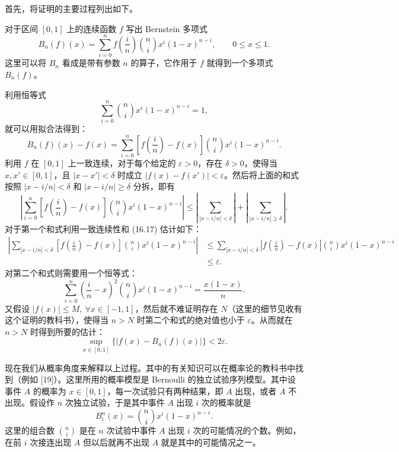 首先，将证明的主要过程列出如下。

对于区间 $[0,1]$ 上的连续函数 $f$ 写出 Bernstein 多项式
\begin{equation}
  B_n(f)(x)=\sum_{i=0}^n f\left(\frac in\right)\binom ni x^i(1-x)^{n-i},
  \qquad 0\leqslant x\leqslant1.
\tag{16.16}
\label{eq:16.16}
\end{equation}
这里可以将 $B_n$ 看成是带有参数 $n$ 的算子，它作用于 $f$ 就得到一个多项式 $B_n(f)$。

利用恒等式
\begin{equation}
  \sum_{i=0}^n\binom ni x^i(1-x)^{n-i}=1,
\tag{16.17}
\label{eq:16.17}
\end{equation}
就可以用拟合法得到：
\[
  B_n(f)(x)-f(x)
  =\sum_{i=0}^n\left[f\left(\frac in\right)-f(x)\right]
   \binom ni x^i(1-x)^{n-i}.
\]
利用 $f$ 在 $[0,1]$ 上一致连续，对于每个给定的 $\varepsilon>0$，存在 $\delta>0$，使得当 $x,x'\in[0,1]$，且 $|x-x'|<\delta$ 时成立 $|f(x)-f(x')|<\varepsilon$。然后将上面的和式按照 $|x-i/n|<\delta$ 和 $|x-i/n|\geqslant\delta$ 分拆，即有
\[
\left|\sum_{i=0}^n\left[f\left(\frac in\right)-f(x)\right]\binom ni x^i(1-x)^{n-i}\right|
\leqslant\left|\sum_{|x-i/n|<\delta}\right|+
\left|\sum_{|x-i/n|\geqslant\delta}\right|.
\]
对于第一个和式利用一致连续性和 (16.17) 估计如下：
\[
\begin{aligned}
  \left|\sum_{|x-i/n|<\delta}\left[f\left(\frac in\right)-f(x)\right]
  \binom ni x^i(1-x)^{n-i}\right|
  &\leqslant\sum_{|x-i/n|<\delta}
  \left|f\left(\frac in\right)-f(x)\right|\binom ni x^i(1-x)^{n-i}\\
  &\leqslant\varepsilon.
\end{aligned}
\]
对第二个和式则需要用一个恒等式：
\begin{equation}
  \sum_{i=0}^n\left(\frac in-x\right)^2\binom ni x^i(1-x)^{n-i}
  =\frac{x(1-x)}n.
\tag{16.18}
\label{eq:16.18}
\end{equation}
又假设 $|f(x)|\leqslant M,\ \forall x\in[-1,1]$，然后就不难证明存在 $N$（这里的细节见收有这个证明的教科书），使得当 $n>N$ 时第二个和式的绝对值也小于 $\varepsilon$。从而就在 $n>N$ 时得到所要的估计：
\[
  \sup_{x\in[0,1]}\{|f(x)-B_n(f)(x)|\}<2\varepsilon.
\]

现在我们从概率角度来解释以上过程。其中的有关知识可以在概率论的教科书中找到（例如 [19]）。这里所用的概率模型是 Bernoulli 的独立试验序列模型。其中设事件 $A$ 的概率为 $x\in[0,1]$，每一次试验只有两种结果，即 $A$ 出现，或者 $A$ 不出现。假设作 $n$ 次独立试验，于是其中事件 $A$ 出现 $i$ 次的概率就是
\begin{equation}
  B_i^n(x)=\binom ni x^i(1-x)^{n-i}.
\tag{16.19}
\label{eq:16.19}
\end{equation}
这里的组合数 $\binom ni$ 是在 $n$ 次试验中事件 $A$ 出现 $i$ 次的可能情况的个数。例如，在前 $i$ 次接连出现 $A$ 但以后就再不出现 $A$ 就是其中的可能情况之一。

